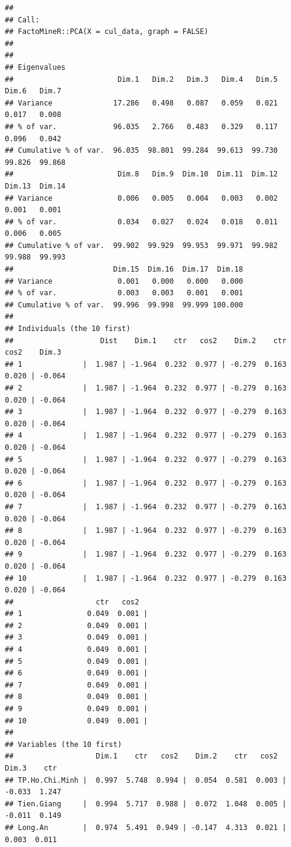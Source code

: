 \documentclass[../thesis.tex]{subfiles}
\begin{document}
\begin{verbatim}
## 
## Call:
## FactoMineR::PCA(X = cul_data, graph = FALSE) 
## 
## 
## Eigenvalues
##                        Dim.1   Dim.2   Dim.3   Dim.4   Dim.5   Dim.6   Dim.7
## Variance              17.286   0.498   0.087   0.059   0.021   0.017   0.008
## % of var.             96.035   2.766   0.483   0.329   0.117   0.096   0.042
## Cumulative % of var.  96.035  98.801  99.284  99.613  99.730  99.826  99.868
##                        Dim.8   Dim.9  Dim.10  Dim.11  Dim.12  Dim.13  Dim.14
## Variance               0.006   0.005   0.004   0.003   0.002   0.001   0.001
## % of var.              0.034   0.027   0.024   0.018   0.011   0.006   0.005
## Cumulative % of var.  99.902  99.929  99.953  99.971  99.982  99.988  99.993
##                       Dim.15  Dim.16  Dim.17  Dim.18
## Variance               0.001   0.000   0.000   0.000
## % of var.              0.003   0.003   0.001   0.001
## Cumulative % of var.  99.996  99.998  99.999 100.000
## 
## Individuals (the 10 first)
##                    Dist    Dim.1    ctr   cos2    Dim.2    ctr   cos2    Dim.3
## 1              |  1.987 | -1.964  0.232  0.977 | -0.279  0.163  0.020 | -0.064
## 2              |  1.987 | -1.964  0.232  0.977 | -0.279  0.163  0.020 | -0.064
## 3              |  1.987 | -1.964  0.232  0.977 | -0.279  0.163  0.020 | -0.064
## 4              |  1.987 | -1.964  0.232  0.977 | -0.279  0.163  0.020 | -0.064
## 5              |  1.987 | -1.964  0.232  0.977 | -0.279  0.163  0.020 | -0.064
## 6              |  1.987 | -1.964  0.232  0.977 | -0.279  0.163  0.020 | -0.064
## 7              |  1.987 | -1.964  0.232  0.977 | -0.279  0.163  0.020 | -0.064
## 8              |  1.987 | -1.964  0.232  0.977 | -0.279  0.163  0.020 | -0.064
## 9              |  1.987 | -1.964  0.232  0.977 | -0.279  0.163  0.020 | -0.064
## 10             |  1.987 | -1.964  0.232  0.977 | -0.279  0.163  0.020 | -0.064
##                   ctr   cos2  
## 1               0.049  0.001 |
## 2               0.049  0.001 |
## 3               0.049  0.001 |
## 4               0.049  0.001 |
## 5               0.049  0.001 |
## 6               0.049  0.001 |
## 7               0.049  0.001 |
## 8               0.049  0.001 |
## 9               0.049  0.001 |
## 10              0.049  0.001 |
## 
## Variables (the 10 first)
##                   Dim.1    ctr   cos2    Dim.2    ctr   cos2    Dim.3    ctr
## TP.Ho.Chi.Minh |  0.997  5.748  0.994 |  0.054  0.581  0.003 | -0.033  1.247
## Tien.Giang     |  0.994  5.717  0.988 |  0.072  1.048  0.005 | -0.011  0.149
## Long.An        |  0.974  5.491  0.949 | -0.147  4.313  0.021 |  0.003  0.011

\end{verbatim}
\end{document}
